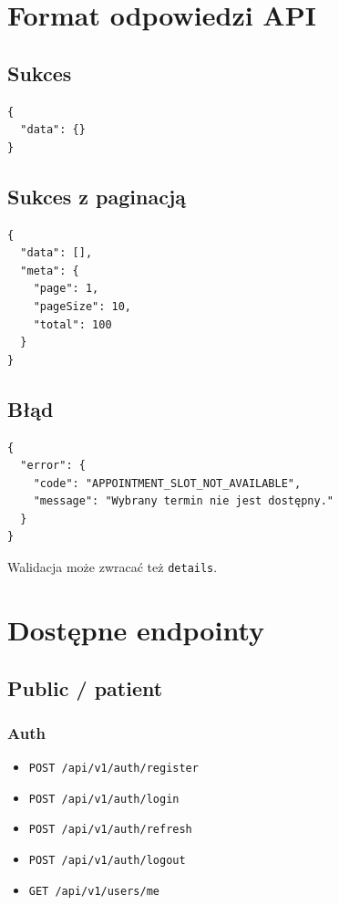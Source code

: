 \documentclass[11pt,a4paper]{article}
\begin{document}
\section{Format odpowiedzi API}

\subsection{Sukces}
\begin{lstlisting}
{
  "data": {}
}
\end{lstlisting}

\subsection{Sukces z paginacją}
\begin{lstlisting}
{
  "data": [],
  "meta": {
    "page": 1,
    "pageSize": 10,
    "total": 100
  }
}
\end{lstlisting}

\subsection{Błąd}
\begin{lstlisting}
{
  "error": {
    "code": "APPOINTMENT_SLOT_NOT_AVAILABLE",
    "message": "Wybrany termin nie jest dostępny."
  }
}
\end{lstlisting}

Walidacja może zwracać też \texttt{details}.

\section{Dostępne endpointy}

\subsection{Public / patient}

\subsubsection*{Auth}
\begin{itemize}[leftmargin=1.2cm]
    \item \texttt{POST /api/v1/auth/register}
    \item \texttt{POST /api/v1/auth/login}
    \item \texttt{POST /api/v1/auth/refresh}
    \item \texttt{POST /api/v1/auth/logout}
    \item \texttt{GET /api/v1/users/me}
\end{itemize}
\end{document}
